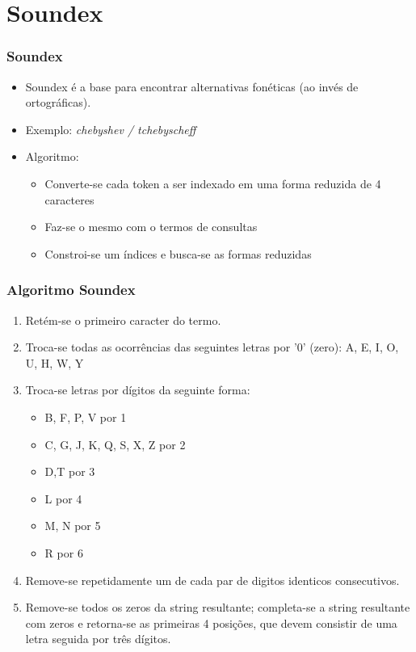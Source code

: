 \documentclass[compress]{beamer}
\begin{document}
\section{Soundex}


\begin{frame}[<+->]
\frametitle{Soundex}
\pause[2]
\begin{itemize}
\item Soundex é a base para encontrar alternativas {\color{blue} fonéticas} (ao
  invés de ortográficas).
\item Exemplo: \emph{chebyshev / tchebyscheff}
\item Algoritmo:
\begin{itemize}
\item Converte-se cada token a ser indexado em uma forma reduzida de 4 
caracteres
\item Faz-se o mesmo com o termos de consultas
\item Constroi-se um índices e busca-se as formas reduzidas
\end{itemize}
\end{itemize}
\end{frame}

\begin{frame}[shrink=10]
\frametitle{Algoritmo Soundex}
\begin{enumerate}
\item
Retém-se o primeiro caracter do termo.
\item
Troca-se todas as ocorrências das seguintes letras por '0'
(zero): A, E, I, O, U, H, W, Y
\item
Troca-se letras por dígitos da seguinte forma:
\begin{itemize}
\item
B, F, P, V por 1
\item
C, G, J, K, Q, S, X, Z por 2
\item
D,T por 3
\item
L por 4
\item
M, N por 5
\item
R por 6
\end{itemize}
\item
Remove-se repetidamente um de cada par de digitos identicos 
consecutivos.
\item
Remove-se todos os zeros da string resultante;
completa-se a string resultante com zeros e retorna-se as primeiras 4 posições, 
que devem consistir de uma letra seguida por três dígitos.
\end{enumerate}

\end{frame}
\end{document}
